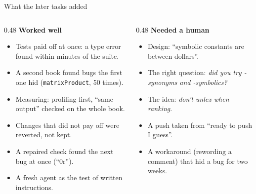 \documentclass[10pt,aspectratio=169]{beamer}
\newcommand{\bad}[1]{\textcolor{warn}{#1}}
\newcommand{\ok}[1]{\textcolor{good}{#1}}
\begin{document}
\begin{frame}{What the later tasks added}
  \begin{columns}[T]
    \begin{column}{0.48\textwidth}
      \ok{\textbf{Worked well}}
      \begin{itemize}\small
        \item Tests paid off at once: a type error found within minutes of the suite.
        \item A second book found bugs the first one hid
              (\texttt{matrixProduct}, 50 times).
        \item Measuring: profiling first, ``same output'' checked on the whole book.
        \item Changes that did not pay off were reverted, not kept.
        \item A repaired check found the next bug at once (``0r'').
        \item A fresh agent as the test of written instructions.
      \end{itemize}
    \end{column}
    \begin{column}{0.48\textwidth}
      \bad{\textbf{Needed a human}}
      \begin{itemize}\small
        \item Design: ``symbolic constants are between dollars''.
        \item The right question: \emph{did you try -synonyms and -symbolics?}
        \item The idea: \emph{don't unlex when ranking}.
        \item A push taken from ``ready to push I guess''.
        \item A workaround (rewording a comment) that hid a bug for two weeks.
      \end{itemize}
    \end{column}
  \end{columns}
\end{frame}
\end{document}
